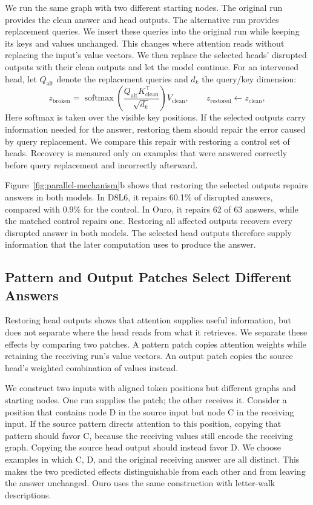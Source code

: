 \documentclass{article}
\begin{document}
We run the same graph with two different starting nodes. The original run provides the clean answer and head outputs. The alternative run provides replacement queries. We insert these queries into the original run while keeping its keys and values unchanged. This changes where attention reads without replacing the input's value vectors. We then replace the selected heads' disrupted outputs with their clean outputs and let the model continue. For an intervened head, let $Q_{\mathrm{alt}}$ denote the replacement queries and $d_k$ the query/key dimension:
\begin{equation}
 z_{\mathrm{broken}}
 =\operatorname{softmax}\!\left(\frac{Q_{\mathrm{alt}}K_{\mathrm{clean}}^\top}{\sqrt{d_k}}\right)V_{\mathrm{clean}},
 \qquad
 z_{\mathrm{restored}}\leftarrow z_{\mathrm{clean}},
\end{equation}
Here softmax is taken over the visible key positions. If the selected outputs carry information needed for the answer, restoring them should repair the error caused by query replacement. We compare this repair with restoring a control set of heads. Recovery is measured only on examples that were answered correctly before query replacement and incorrectly afterward.

Figure~\ref{fig:parallel-mechanism}b shows that restoring the selected outputs repairs answers in both models. In D8L6, it repairs 60.1\% of disrupted answers, compared with 0.9\% for the control. In Ouro, it repairs 62 of 63 answers, while the matched control repairs one. Restoring all affected outputs recovers every disrupted answer in both models. The selected head outputs therefore supply information that the later computation uses to produce the answer.

\subsection{Pattern and Output Patches Select Different Answers}
\label{sec:causal}
Restoring head outputs shows that attention supplies useful information, but does not separate where the head reads from what it retrieves. We separate these effects by comparing two patches. A pattern patch copies attention weights while retaining the receiving run's value vectors. An output patch copies the source head's weighted combination of values instead.

We construct two inputs with aligned token positions but different graphs and starting nodes. One run supplies the patch; the other receives it. Consider a position that contains node D in the source input but node C in the receiving input. If the source pattern directs attention to this position, copying that pattern should favor C, because the receiving values still encode the receiving graph. Copying the source head output should instead favor D. We choose examples in which C, D, and the original receiving answer are all distinct. This makes the two predicted effects distinguishable from each other and from leaving the answer unchanged. Ouro uses the same construction with letter-walk descriptions.
\end{document}
